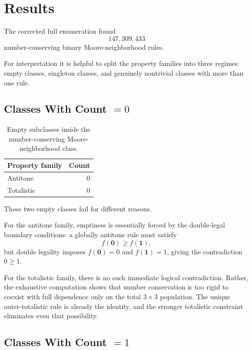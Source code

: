 \documentclass[11pt,a4paper]{article}
\begin{document}
\section{Results}

The corrected full enumeration found
\[
147{,}309{,}433
\]
number-conserving binary Moore-neighborhood rules.

For interpretation it is helpful to split the property families into three regimes: empty
classes, singleton classes, and genuinely nontrivial classes with more than one rule.

\subsection{Classes With Count \(=0\)}

\begin{table}[htbp]
\centering
\begin{tabular}{@{}lr@{}}
\toprule
Property family & Count \\
\midrule
Antitone & 0 \\
Totalistic & 0 \\
\bottomrule
\end{tabular}
\caption{Empty subclasses inside the number-conserving Moore-neighborhood class.}
\label{tab:counts-zero}
\end{table}

These two empty classes fail for different reasons.

For the antitone family, emptiness is essentially forced by the double-legal boundary
conditions: a globally antitone rule must satisfy
\[
f(\mathbf{0}) \ge f(\mathbf{1}),
\]
but double legality imposes \(f(\mathbf{0})=0\) and \(f(\mathbf{1})=1\), giving the
contradiction \(0 \ge 1\).

For the totalistic family, there is no such immediate logical contradiction.  Rather, the
exhaustive computation shows that number conservation is too rigid to coexist with full
dependence only on the total \(3\times 3\) population.  The unique outer-totalistic rule is
already the identity, and the stronger totalistic constraint eliminates even that possibility.

\subsection{Classes With Count \(=1\)}
\end{document}

